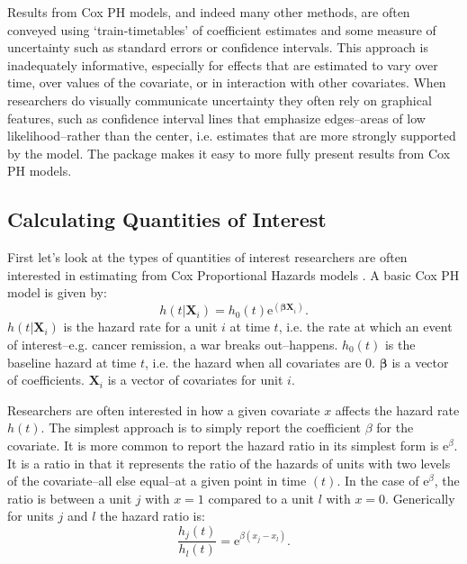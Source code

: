 \documentclass[nojss]{jss}\usepackage{graphicx, color}
\begin{document}
Results from Cox PH models, and indeed many other methods, are often conveyed using `train-timetables' of coefficient estimates and some measure of uncertainty such as standard errors or confidence intervals. This approach is inadequately informative, especially for effects that are estimated to vary over time, over values of the covariate, or in interaction with other covariates. When researchers do visually communicate uncertainty they often rely on graphical features, such as confidence interval lines that emphasize edges--areas of low likelihood--rather than the center, i.e. estimates that are more strongly supported by the model. The  package makes it easy to more fully present results from Cox PH models.


\subsection{Calculating Quantities of Interest}

First let's look at the types of quantities of interest researchers are often interested in estimating from Cox Proportional Hazards models \citep{Cox1972}. A basic Cox PH model is given by:
%
\begin{equation}
    h(t|\mathbf{X}_{i}) = h_{0}(t)\mathrm{e}^{(\mathbf{\beta X}_{i})}.
\end{equation}
%
$h(t|\mathbf{X}_{i})$ is the hazard rate for a unit $i$ at time $t$, i.e. the rate at which an event of interest--e.g. cancer remission, a war breaks out--happens. $h_{0}(t)$ is the baseline hazard at time $t$, i.e. the hazard when all covariates are 0. $\mathbf{\beta}$ is a vector of coefficients. $\mathbf{X}_{i}$ is a vector of covariates for unit $i$.

Researchers are often interested in how a given covariate $x$ affects the hazard rate $h(t)$. The simplest approach is to simply report the coefficient $\beta$ for the covariate. It is more common to report the hazard ratio in its simplest form is $\mathrm{e}^{\beta}$. It is a ratio in that it represents the ratio of the hazards of units with two levels of the covariate--all else equal--at a given point in time $(t)$. In the case of $\mathrm{e}^{\beta}$, the ratio is between a unit $j$ with $x = 1$ compared to a unit $l$ with $x = 0$. Generically for units $j$ and $l$ the hazard ratio is:
%
\begin{equation}
	\frac{h_{j}(t)}{h_{l}(t)} = \mathrm{e}^{\beta(x_{j} - x_{l})}.
\end{equation}
\end{document}
